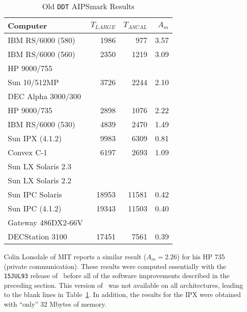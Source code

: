 \begin{table}
\protect\begin{center}
\protect\begin{tabular}{|l|r|r|r|} \hline
Computer           & $T_{LARGE}$ & $T_{ASCAL}$ & $A_m$ \\
\hline
IBM RS/6000 (580)  &  1986 &   977 & 3.57 \\
IBM RS/6000 (560)  &  2350 &  1219 & 3.09 \\
HP 9000/755        &       &       &      \\
Sun 10/512MP       &  3726 &  2244 & 2.10 \\
DEC Alpha 3000/300 &       &       &      \\
HP 9000/735        &  2898 &  1076 & 2.22 \\
IBM RS/6000 (530)  &  4839 &  2470 & 1.49     \\
Sun IPX (4.1.2)    &  9983 &  6309 & 0.81 \\
Convex C-1         &  6197 &  2693 & 1.09 \\
Sun LX Solaris 2.3 &       &       &      \\
Sun LX Solaris 2.2 &       &       &      \\
Sun IPC Solaris    & 18953 & 11581 & 0.42 \\
Sun IPC (4.1.2)    & 19343 & 11503 & 0.40 \\
Gateway 486DX2-66V &       &             &      \\
DECStation 3100    & 17451 &  7561 & 0.39 \\
\hline
\end{tabular}
\end{center}
\caption{Old {\tt DDT} AIPSmark Results}
\label{ta:oldAm}
\end{table}
Colin Lonsdale of MIT reports a similar result ($A_m = 2.26$) for his
HP 735 (private communication).  These results were computed
essentially with the {\tt 15JUL93} release of \AIPS\ before all of the
software improvements described in the preceding section.  This
version of \AIPS\ was not available on all architectures, leading to
the blank lines in Table~\ref{ta:oldAm}.  In addition, the results for
the IPX were obtained with ``only'' 32 Mbytes of memory.

